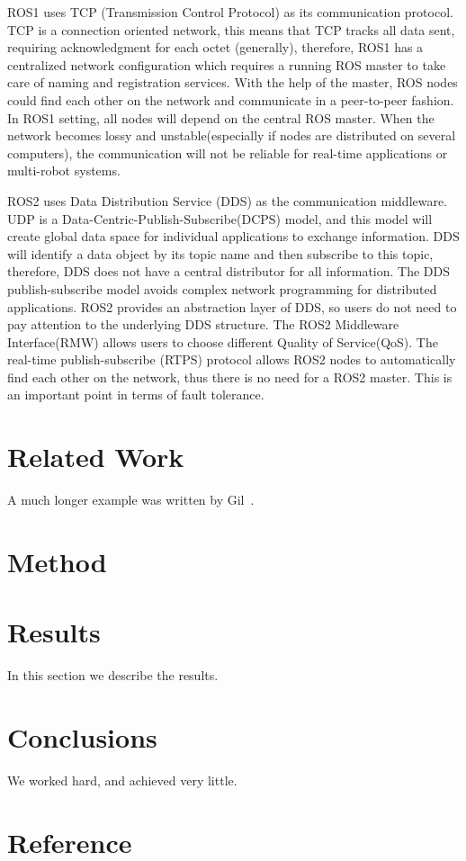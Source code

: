 \documentclass[12pt]{article}
\begin{document}
ROS1 uses TCP (Transmission Control Protocol) as its communication protocol. TCP is a connection oriented network, this means that TCP tracks all data sent, requiring acknowledgment for each octet (generally), therefore,  ROS1 has a centralized network configuration which requires a running ROS master to take care of naming and registration services. With the help of the master, ROS nodes could find each other on the network and communicate in a peer-to-peer fashion. In ROS1 setting, all nodes will depend on the central ROS master. When the network becomes lossy and unstable(especially if nodes are distributed on several computers), the communication will not be reliable for real-time applications or multi-robot systems.

ROS2 uses Data Distribution Service (DDS) as the communication middleware. UDP is a Data-Centric-Publish-Subscribe(DCPS) model, and this model will create global data space for individual applications to exchange information. DDS will identify a data object by its topic name and then subscribe to this topic, therefore, DDS does not have a central distributor for all information. The DDS publish-subscribe model avoids complex network programming for distributed applications.  ROS2 provides an abstraction layer of DDS, so users do not need to pay attention to the underlying DDS structure. The ROS2 Middleware Interface(RMW) allows users to choose different Quality of Service(QoS). The real-time publish-subscribe (RTPS) protocol allows ROS2 nodes to automatically find each other on the network, thus there is no need for a ROS2 master. This is an important point in terms of fault tolerance.



\section{Related Work}\label{related Work}
A much longer \LaTeXe{} example was written by Gil~\cite{Gil:02}.

\section{Method}\label{method}
\section{Results}\label{results}
In this section we describe the results.

\section{Conclusions}\label{conclusions}
We worked hard, and achieved very little.

\section{Reference}\label{reference}


\end{document}
